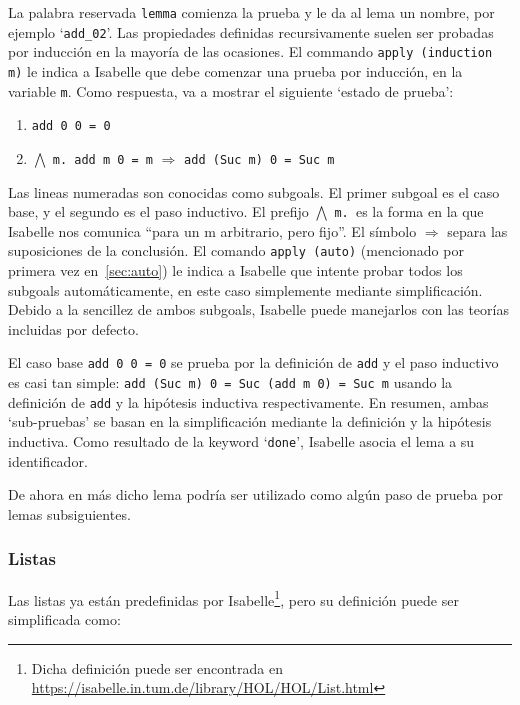 \documentclass[12pt]{book}
\begin{document}
La palabra reservada \texttt{lemma} comienza la prueba y le da al lema un nombre, por ejemplo `\texttt{add\_02}'. Las propiedades definidas recursivamente suelen ser probadas por inducción en la mayoría de las ocasiones. El commando \texttt{apply (induction m)} le indica a Isabelle que debe comenzar una prueba por inducción, en la variable \texttt{m}. Como respuesta, va a mostrar el siguiente `estado de prueba':

\begin{enumerate}
	\item \texttt{add 0 0 = 0}
	\item $\bigwedge$ \texttt{m.\ add m 0 = m} $\Longrightarrow$ \texttt{add (Suc m) 0 = Suc m}	
\end{enumerate}

Las lineas numeradas son conocidas como subgoals. El primer subgoal es el caso base, y el segundo es el paso inductivo. El prefijo $\bigwedge$ \texttt{m. }es la forma en la que Isabelle nos comunica ``para un m arbitrario, pero fijo''. El símbolo $\Longrightarrow$ separa las suposiciones de la conclusión. El comando \texttt{apply (auto)} (mencionado por primera vez en~\ref{sec:auto}) le indica a Isabelle que intente probar todos los subgoals automáticamente, en este caso simplemente mediante simplificación. Debido a la sencillez de ambos subgoals, Isabelle puede manejarlos con las teorías incluidas por defecto. 

El caso base \texttt{add 0 0 = 0} se prueba por la definición de \texttt{add} y el paso inductivo es casi tan simple: \texttt{add (Suc m) 0 = Suc (add m 0) = Suc m} usando la definición de \texttt{add} y la hipótesis inductiva respectivamente. En resumen, ambas `sub-pruebas' se basan en la simplificación mediante la definición y la hipótesis inductiva. Como resultado de la keyword `\texttt{done}', Isabelle asocia el lema a su identificador.

De ahora en más dicho lema podría ser utilizado como algún paso de prueba por lemas subsiguientes.

\subsubsection{Listas}

Las listas ya están predefinidas por Isabelle\footnote{Dicha definición puede ser encontrada en \href{https://isabelle.in.tum.de/library/HOL/HOL/List.html}{https://isabelle.in.tum.de/library/HOL/HOL/List.html}}, pero su definición puede ser simplificada como:
\end{document}
